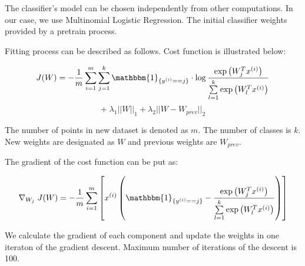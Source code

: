 The classifier's model can be chosen independently from other computations. In our case, we use Multinomial Logistic Regression. The initial classifier weights provided by a pretrain process. 

Fitting process can be described as follows. Cost function is illustrated below:

\begin{center}

$$ J(W) = -\frac{1}{m} \sum \limits_{i = 1}^{m} \sum \limits_{j = 1}^{k} \mathbbm{1}_{\{y^{(i)} == j\}} \cdot \log \frac{\exp\left({W_{j}^Tx^{(i)}}\right) }{\sum \limits_{l = 1}^{k}  \exp\left({W_{l}^Tx^{(i)}}\right) }$$ 
 $$ + \; \lambda_1 ||W||_1 + \lambda_2 ||W - W_{prev}||_2 $$

\end{center} 

The number of points in new dataset is denoted as $m$. The number of classes is $k$. New weights are designated as $W$ and previous weights are $W_{prev}$.

The gradient of the cost function can be put as:

$$ \nabla_{W_j} \; J(W) = -\frac{1}{m} \sum \limits_{i = 1}^{m} \left[ x^{(i)} \left( \mathbbm{1}_{\{y^{(i)} == j\} } - \frac{\exp\left({W_{j}^Tx^{(i)}}\right)}{\sum \limits_{l = 1}^{k}  \exp\left({W_{l}^Tx^{(i)}}\right)} \right) \right] $$

We calculate the gradient of each component and update the weights in one iteraton of the gradient descent. Maximum number of iterations of the descent is 100.
